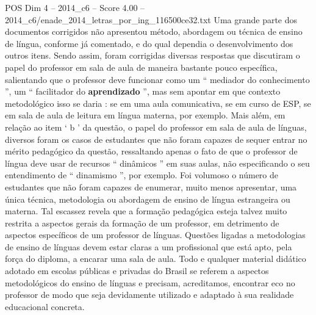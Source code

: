 \begin{textsample}{POS Dim 4 – 2014\_c6 – Score 4.00 – 2014\_c6/enade\_2014\_letras\_por\_ing\_116500ce32.txt}
Uma grande parte dos documentos corrigidos não apresentou método, abordagem ou técnica de ensino de língua, conforme já comentado, e do qual dependia o desenvolvimento dos outros itens.
Sendo assim, foram corrigidas diversas respostas que discutiram o papel do professor em sala de aula de maneira bastante pouco específica, salientando que o professor deve funcionar como um “ mediador do conhecimento ”, um “ facilitador do \textbf{aprendizado} ”, mas sem apontar em que contexto metodológico isso se daria : se em uma aula comunicativa, se em curso de ESP, se em sala de aula de leitura em língua materna, por exemplo.
Mais além, em relação ao item ‘ b ’ da questão, o papel do professor em sala de aula de línguas, diversos foram os casos de estudantes que não foram capazes de sequer entrar no mérito pedagógico da questão, ressaltando apenas o fato de que o professor de língua deve usar de recursos “ dinâmicos ” em suas aulas, não especificando o seu entendimento de “ dinamismo ”, por exemplo.
Foi volumoso o número de estudantes que não foram capazes de enumerar, muito menos apresentar, uma única técnica, metodologia ou abordagem de ensino de língua estrangeira ou materna.
Tal escassez revela que a formação pedagógica esteja talvez muito restrita a aspectos gerais da formação de um professor, em detrimento de aspectos específicos de um professor de línguas.
Questões ligadas a metodologias de ensino de línguas devem estar claras a um profissional que está apto, pela força do diploma, a encarar uma sala de aula.
Todo e qualquer material didático adotado em escolas públicas e privadas do Brasil se referem a aspectos metodológicos do ensino de línguas e precisam, acreditamos, encontrar eco no professor de modo que seja devidamente utilizado e adaptado à sua realidade educacional concreta.

\end{textsample}
